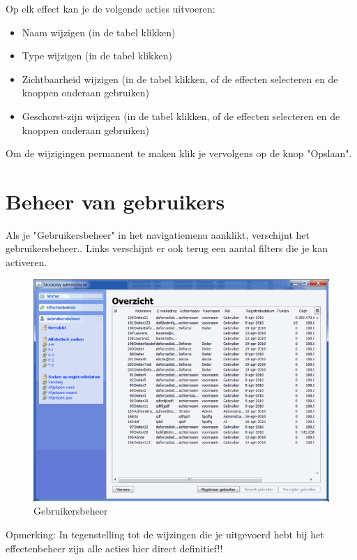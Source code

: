 Op elk effect kan je de volgende acties uitvoeren:

\begin{itemize}
\item{Naam wijzigen (in de tabel klikken)}
\item{Type wijzigen (in de tabel klikken)}
\item{Zichtbaarheid wijzigen (in de tabel klikken, of de effecten selecteren en de knoppen onderaan gebruiken)}
\item{Geschorst-zijn wijzigen (in de tabel klikken, of de effecten selecteren en de knoppen onderaan gebruiken)}
\end{itemize}

Om de wijzigingen permanent te maken klik je vervolgens op de knop "Opslaan".

\section{Beheer van gebruikers}

Als je "Gebruikersbeheer" in het navigatiemenu aanklikt, verschijnt het gebruikersbeheer..
Links verschijnt er ook terug een aantal filters die je kan activeren.

\begin{figure}[h!]
	\centering
		\includegraphics[width=\textwidth]{images/handleiding/handleiding5.png}
	\caption{Gebruikersbeheer}
\end{figure}

Opmerking: In tegenstelling tot de wijzingen die je uitgevoerd hebt bij het effectenbeheer zijn alle acties hier direct definitief!!

